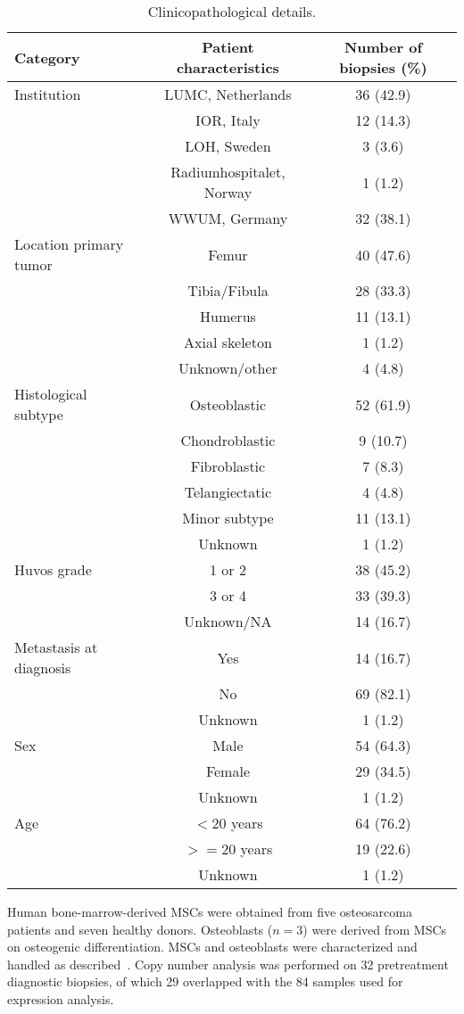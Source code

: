 \begin{table}[htbp]
	\centering
	\small
		\begin{tabular}[c]{|lcc|}
		\hline
		Category & Patient characteristics & Number of biopsies (\%)\\
		\hline
		Institution & LUMC, Netherlands & 36 (42.9)\\
		& IOR, Italy & 12 (14.3)\\
		& LOH, Sweden & 3 (3.6)\\
		& Radiumhospitalet, Norway & 1 (1.2)\\
		& WWUM, Germany & 32 (38.1)\\
		Location primary tumor & Femur & 40 (47.6)\\
		& Tibia/Fibula & 28 (33.3)\\
		& Humerus & 11 (13.1)\\
		& Axial skeleton & 1 (1.2)\\
		& Unknown/other & 4 (4.8)\\
		Histological subtype & Osteoblastic & 52 (61.9)\\
		& Chondroblastic & 9 (10.7)\\
		& Fibroblastic & 7 (8.3)\\
		& Telangiectatic & 4 (4.8)\\
		& Minor subtype & 11 (13.1)\\
		& Unknown & 1 (1.2)\\
		Huvos grade & 1 or 2 & 38 (45.2)\\
		& 3 or 4 & 33 (39.3)\\
		& Unknown/NA & 14 (16.7)\\
		Metastasis at diagnosis & Yes & 14 (16.7)\\
		& No & 69 (82.1)\\
		& Unknown & 1 (1.2)\\
		Sex & Male & 54 (64.3)\\
		& Female & 29 (34.5)\\
		& Unknown & 1 (1.2)\\
		Age & $<20$ years & 64 (76.2)\\
		& $>=20$ years & 19 (22.6)\\
		& Unknown & 1 (1.2)\\
		\hline
		\end{tabular}
\caption{Clinicopathological details.}
	\label{tab7.1}  
\end{table}
%
Human bone\hyp{}marrow\hyp{}derived
MSCs were obtained from five osteosarcoma
patients and seven healthy donors. Osteoblasts
($n=3$) were derived from MSCs on
osteogenic differentiation. MSCs and osteoblasts
were characterized and handled as described~\cite{cleton2009profiling}. Copy number analysis
was performed on 32 pretreatment diagnostic
biopsies, of which 29 overlapped with the 84
samples used for expression analysis.

